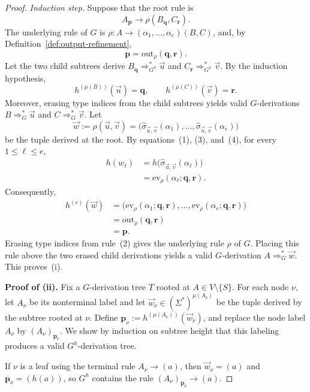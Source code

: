 \documentclass[11pt,a4paper]{article}
\theoremstyle{remark}
\newcommand{\out}{\mathrm{out}}
\newcommand{\ev}{\mathrm{ev}}
\newcommand{\tuple}[1]{\vec{#1}}
\begin{document}
\begin{proof}
\smallskip
\noindent
\emph{Induction step.}
Suppose that the root rule is
\[
  A_{\mathbf p}
  \to
  \rho(B_{\mathbf q},C_{\mathbf r}).
  \tag{2}
\]
The underlying rule of \(G\) is
\(\rho\colon A\to(\alpha_1,\ldots,\alpha_e)(B,C)\), and, by
Definition~\ref{def:output-refinement},
\[
  \mathbf p=\out_\rho(\mathbf q,\mathbf r).
  \tag{3}
\]
Let the two child subtrees derive
\(B_{\mathbf q}\Rightarrow_{G^h}^*\tuple u\) and
\(C_{\mathbf r}\Rightarrow_{G^h}^*\tuple v\).
By the induction hypothesis,
\[
  h^{(\mu(B))}(\tuple u)=\mathbf q,
  \qquad
  h^{(\mu(C))}(\tuple v)=\mathbf r.
  \tag{4}
\]
Moreover, erasing type indices from the child subtrees yields valid
\(G\)-derivations \(B\Rightarrow_G^*\tuple u\) and
\(C\Rightarrow_G^*\tuple v\).
Let
\[
  \tuple w
  :=
  \rho(\tuple u,\tuple v)
  =
  \bigl(
    \widehat{\sigma}_{\tuple u,\tuple v}(\alpha_1),
    \ldots,
    \widehat{\sigma}_{\tuple u,\tuple v}(\alpha_e)
  \bigr)
\]
be the tuple derived at the root.  By equations~\textup{(1)}, \textup{(3)},
and~\textup{(4)}, for every \(1\le\ell\le e\),
\[
\begin{aligned}
  h(w_\ell)
  &=
  h\bigl(
    \widehat{\sigma}_{\tuple u,\tuple v}(\alpha_\ell)
  \bigr)
  \\
  &=
  \ev_\rho(\alpha_\ell;\mathbf q,\mathbf r).
\end{aligned}
\]
Consequently,
\[
\begin{aligned}
  h^{(e)}(\tuple w)
  &=
  \bigl(
    \ev_\rho(\alpha_1;\mathbf q,\mathbf r),
    \ldots,
    \ev_\rho(\alpha_e;\mathbf q,\mathbf r)
  \bigr)
  \\
  &=
  \out_\rho(\mathbf q,\mathbf r)
  \\
  &=
  \mathbf p.
\end{aligned}
\]
Erasing type indices from rule~\textup{(2)} gives the underlying rule \(\rho\)
of \(G\).  Placing this rule above the two erased child derivations yields a
valid \(G\)-derivation \(A\Rightarrow_G^*\tuple w\).
This proves~(i).

\medskip
\noindent
\textbf{Proof of (ii).}
Fix a \(G\)-derivation tree \(T\) rooted at
\(A\in V\setminus\{S\}\).  For each node \(\nu\), let \(A_\nu\) be its
nonterminal label and let
\(\tuple w_\nu\in(\Sigma^*)^{\mu(A_\nu)}\) be the tuple derived by the
subtree rooted at \(\nu\).  Define
\(\mathbf p_\nu:=h^{(\mu(A_\nu))}(\tuple w_\nu)\), and replace the node label
\(A_\nu\) by \((A_\nu)_{\mathbf p_\nu}\).
We show by induction on subtree height that this labeling produces a valid
\(G^h\)-derivation tree.

If \(\nu\) is a leaf using the terminal rule \(A_\nu\to(a)\), then
\(\tuple w_\nu=(a)\) and \(\mathbf p_\nu=(h(a))\), so \(G^h\) contains the
rule \((A_\nu)_{\mathbf p_\nu}\to(a)\).


\end{proof}
\end{document}
